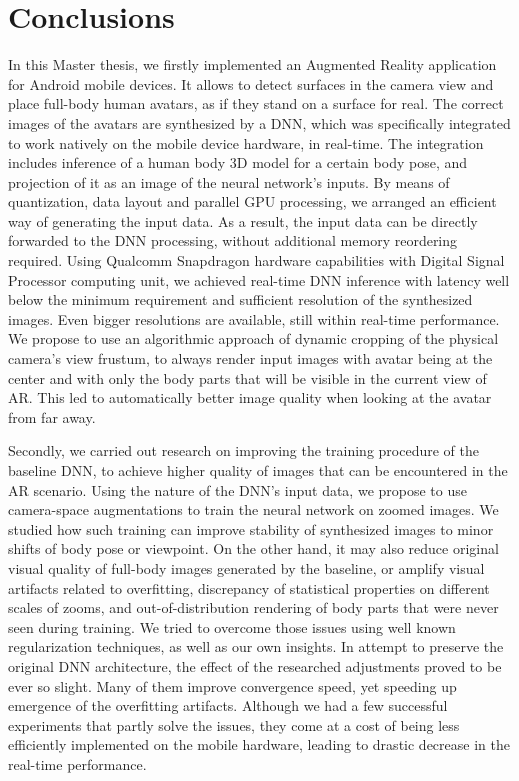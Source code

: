 \chapter{Conclusions}\label{chapter:conclusions}

In this Master thesis, we firstly implemented an Augmented Reality application for Android mobile devices. It allows to detect surfaces in the camera view and place full-body human avatars, as if they stand on a surface for real. The correct images of the avatars are synthesized by a DNN, which was specifically integrated to work natively on the mobile device hardware, in real-time. The integration includes inference of a human body 3D model for a certain body pose, and projection of it as an image of the neural network's inputs. By means of quantization, data layout and parallel GPU processing, we arranged an efficient way of generating the input data. As a result, the input data can be directly forwarded to the DNN processing, without additional memory reordering required. Using Qualcomm Snapdragon hardware capabilities with Digital Signal Processor computing unit, we achieved real-time DNN inference with latency well below the minimum requirement and sufficient resolution of the synthesized images. Even bigger resolutions are available, still within real-time performance. We propose to use an algorithmic approach of dynamic cropping of the physical camera's view frustum, to always render input images with avatar being at the center and with only the body parts that will be visible in the current view of AR. This led to automatically better image quality when looking at the avatar from far away.

Secondly, we carried out research on improving the training procedure of the baseline DNN, to achieve higher quality of images that can be encountered in the AR scenario. Using the nature of the DNN's input data, we propose to use camera-space augmentations to train the neural network on zoomed images. We studied how such training can improve stability of synthesized images to minor shifts of body pose or viewpoint. On the other hand, it may also reduce original visual quality of full-body images generated by the baseline, or amplify visual artifacts related to overfitting, discrepancy of statistical properties on different scales of zooms, and out-of-distribution rendering of body parts that were never seen during training. We tried to overcome those issues using well known regularization techniques, as well as our own insights. In attempt to preserve the original DNN architecture, the effect of the researched adjustments proved to be ever so slight. Many of them improve convergence speed, yet speeding up emergence of the overfitting artifacts. Although we had a few successful experiments that partly solve the issues, they come at a cost of being less efficiently implemented on the mobile hardware, leading to drastic decrease in the real-time performance. 

